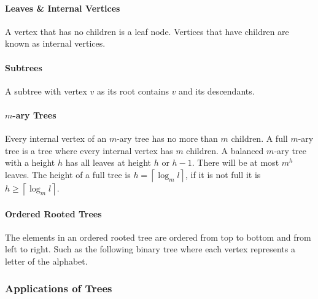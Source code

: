 \documentclass[a4paper, 10pt]{article}
\begin{document}
\paragraph{Leaves \& Internal Vertices}
A vertex that has no children is a leaf node. Vertices that have children are known as internal vertices.
\paragraph{Subtrees}
A subtree with vertex \(v\) as its root contains \(v\) and its descendants.
\paragraph{\(m\)-ary Trees}
Every internal vertex of an \(m\)-ary tree has no more than \(m\) children. A full \(m\)-ary tree is a tree where every internal vertex has \(m\) children. A balanced \(m\)-ary tree with a height \(h\) has all leaves at height \(h\) or \(h-1\). There will be at most \(m^h\) leaves. The height of a full tree is \(h=\left\lceil{\log_ml}\right\rceil\), if it is not full it is \(h\geq\left\lceil{\log_ml}\right\rceil\).
\paragraph{Ordered Rooted Trees}
The elements in an ordered rooted tree are ordered from top to bottom and from left to right. Such as the following binary tree where each vertex represents a letter of the alphabet.
\begin{center}
\end{center}

\subsubsection{Applications of Trees}
\end{document}

